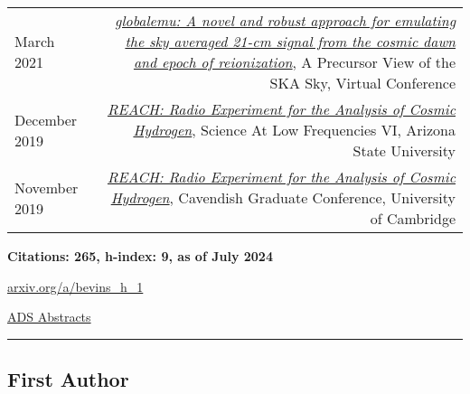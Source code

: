 \documentclass{article}
\begin{document}
\begin{tabular}{L!{\vrule}R}
	March 2021 & \href{https://github.com/htjb/Talks/blob/master/Posters/SKA_globalemu_March_2021/globalemu.pdf}{\textit{globalemu: A novel and robust approach for emulating the sky averaged 21-cm signal from the cosmic dawn and epoch of reionization}}, A Precursor View of the SKA Sky, Virtual Conference\\
	December 2019 & \href{https://drive.google.com/file/d/1dvgumyu4cXxXqoYxikU3DKOa4u_gpGzn/view}{\textit{REACH: Radio Experiment for the Analysis of Cosmic Hydrogen}}, Science At Low Frequencies VI, Arizona State University \\
	November 2019 & \href{https://github.com/htjb/Talks/blob/master/Posters/Cav_Graduate_Conf_REACH_Nov_2019/REACH_poster.pdf}{\textit{REACH: Radio Experiment for the Analysis of Cosmic Hydrogen}}, Cavendish Graduate Conference, University of Cambridge
\end{tabular}

\hfill \break

 \hfill \textbf{Citations: 265, h-index: 9, as of July 2024}

\hfill \href{http://arxiv.org/a/bevins_h_1}{arxiv.org/a/bevins\_h\_1}

\hfill \href{https://ui.adsabs.harvard.edu/search/p_=0&q=author\%3A\%22Bevins\%2C\%20H.\%20T.\%20J.\%22&sort=date\%20desc\%2C\%20bibcode\%20desc}{ADS Abstracts}
\par\noindent\rule{\textwidth}{0.5pt}


\subsection*{First Author}
\end{document}
